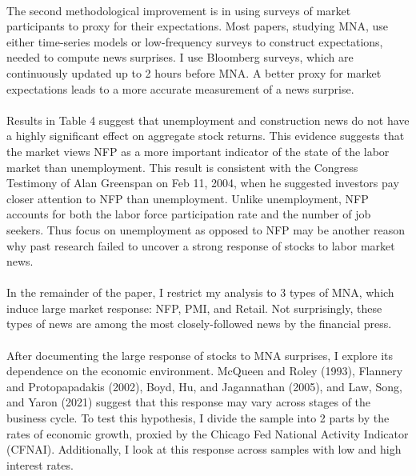 \documentclass[12pt]{article}
\begin{document}
\paragraph{}
The second methodological improvement is in using surveys of market participants to proxy for their expectations. Most papers, studying MNA, use either time-series models or low-frequency surveys to construct expectations, needed to compute news surprises. I use Bloomberg surveys, which are continuously updated up to 2 hours before MNA. A better proxy for market expectations leads to a more accurate measurement of a news surprise.
\paragraph{}
Results in Table 4 suggest that unemployment and construction news do not have a highly significant effect on aggregate stock returns. This evidence suggests that the market views NFP as a more important indicator of the state of the labor market than unemployment. This result is consistent with the Congress Testimony of Alan Greenspan on Feb 11, 2004, when he suggested investors pay closer attention to NFP than unemployment. Unlike unemployment, NFP accounts for both the labor force participation rate and the number of job seekers. Thus focus on unemployment as opposed to NFP may be another reason why past research failed to uncover a strong response of stocks to labor market news.
\paragraph{}
In the remainder of the paper, I restrict my analysis to 3 types of MNA, which induce large market response: NFP, PMI, and Retail. Not surprisingly, these types of news are among the most closely-followed news by the financial press. 
\paragraph{}
After documenting the large response of stocks to MNA surprises, I explore its dependence on the economic environment. McQueen and Roley (1993), Flannery and Protopapadakis (2002), Boyd, Hu, and Jagannathan (2005), and Law, Song, and Yaron (2021) suggest that this response may vary across stages of the business cycle. To test this hypothesis, I divide the sample into 2 parts by the rates of economic growth, proxied by the Chicago Fed National Activity Indicator (CFNAI). Additionally, I look at this response across samples with low and high interest rates.
\end{document}
